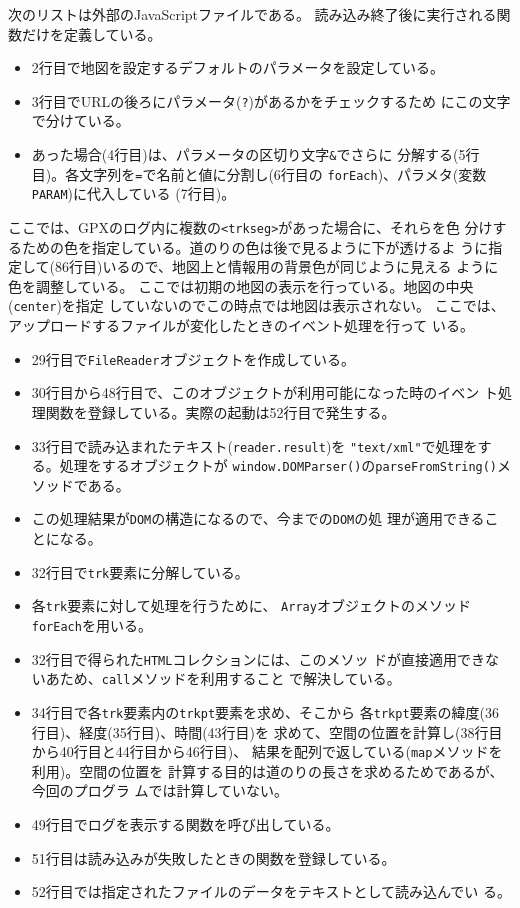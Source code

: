  次のリストは外部のJavaScriptファイルである。
読み込み終了後に実行される関数だけを定義している。
 \begin{itemize}
  \item 2行目で地図を設定するデフォルトのパラメータを設定している。
	\item 3行目でURLの後ろにパラメータ(\Verb+?+)があるかをチェックするため
        にこの文字で分けている。
	\item あった場合(4行目)は、パラメータの区切り文字\Verb+&+でさらに
				分解する(5行目)。各文字列を\Verb+=+で名前と値に分割し(6行目の
				\Verb+forEach+)、パラメタ(変数\Verb+PARAM+)に代入している
				(7行目)。
 \end{itemize}
 ここでは、GPXのログ内に複数の\Verb+<trkseg>+があった場合に、それらを色
 分けするための色を指定している。道のりの色は後で見るように下が透けるよ
 うに指定して(86行目)いるので、地図上と情報用の背景色が同じように見える
 ように色を調整している。
 ここでは初期の地図の表示を行っている。地図の中央(\texttt{center})を指定
 していないのでこの時点では地図は表示されない。
 ここでは、アップロードするファイルが変化したときのイベント処理を行って
 いる。
 \begin{itemize}
	\item 29行目で\Verb+FileReader+オブジェクトを作成している。
	\item 30行目から48行目で、このオブジェクトが利用可能になった時のイベン
				ト処理関数を登録している。実際の起動は52行目で発生する。
	\item 33行目で読み込まれたテキスト(\texttt{reader.result})を
				\Verb+"text/xml"+で処理をする。処理をするオブジェクトが
				\Verb+window.DOMParser()+の\Verb+parseFromString()+メソッドである。
	\item この処理結果が\Verb+DOM+の構造になるので、今までの\Verb+DOM+の処
				理が適用できることになる。
	\item 32行目で\texttt{trk}要素に分解している。
	\item 各\texttt{trk}要素に対して処理を行うために、
				\texttt{Array}オブジェクトのメソッド\texttt{forEach}を用いる。
	\item 32行目で得られた\texttt{HTML}コレクションには、このメソッ
				ドが直接適用できないあため、\texttt{call}メソッドを利用すること
				で解決している。
	\item 34行目で各\texttt{trk}要素内の\texttt{trkpt}要素を求め、そこから
				各\texttt{trkpt}要素の緯度(36行目)、経度(35行目)、時間(43行目)を
				求めて、空間の位置を計算し(38行目から40行目と44行目から46行目)、
				結果を配列で返している(\texttt{map}メソッドを利用)。空間の位置を
				計算する目的は道のりの長さを求めるためであるが、今回のプログラ
				ムでは計算していない。
	\item 49行目でログを表示する関数を呼び出している。
	\item 51行目は読み込みが失敗したときの関数を登録している。
	\item 52行目では指定されたファイルのデータをテキストとして読み込んでい
				る。
 \end{itemize}
